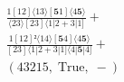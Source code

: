 \documentclass[varwidth, border=5pt]{standalone}
\begin{document}
\begin{my}
$\begin{gathered}
\scriptscriptstyle\frac{1[12]⟨13⟩[𝟓1]⟨4𝟓⟩}{⟨23⟩[23]⟨1|2+3|1]} +\\
\scriptscriptstyle\frac{1[12]²⟨14⟩[𝟓4]⟨4𝟓⟩}{[23]⟨1|2+3|1]⟨4|𝟓|4]} +\\
\scriptscriptstyle(43215,\;\text{True},\;-) \phantom{+}
\end{gathered}$
\end{my}
\end{document}
